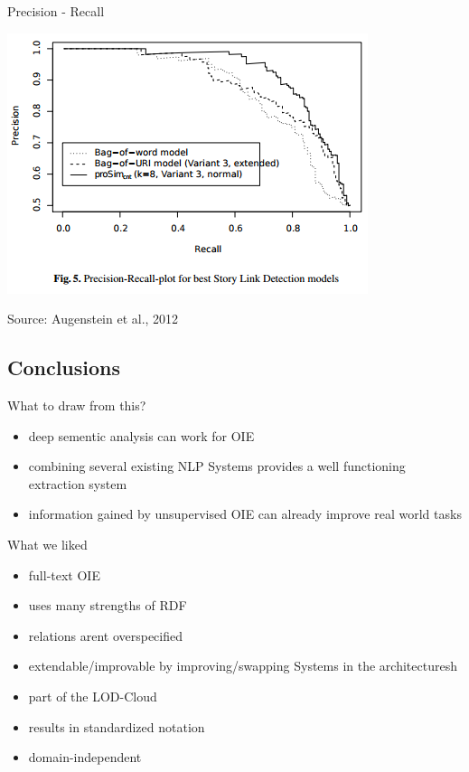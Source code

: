 \documentclass[11pt]{beamer}
\begin{document}
		\begin{frame}{Precision - Recall}
			\begin{center}
				\includegraphics[scale=0.8]{img/lodifierevaplot.png}
			\end{center}
			\begin{scriptsize}Source: Augenstein et al., 2012\end{scriptsize}
		\end{frame}
	\subsection{Conclusions}
		\begin{frame}{What to draw from this?}
			\begin{itemize}
				\item deep sementic analysis can work for OIE
				\item combining several existing NLP Systems provides a well functioning extraction system
				\item information gained by unsupervised OIE can already improve real world tasks
			\end{itemize}
		\end{frame}			
		
		\begin{frame}{What we liked}
			\begin{itemize}
				\item<1-7> full-text OIE
				\item<2-7> uses many strengths of RDF
				\item<3-7> relations arent overspecified
				\item<4-7> extendable/improvable by improving/swapping Systems in the architecturesh
				\item<5-7> part of the LOD-Cloud
				\item<6-7> results in standardized notation
				\item<7> domain-independent
			\end{itemize}
		\end{frame}
		
\end{document}
